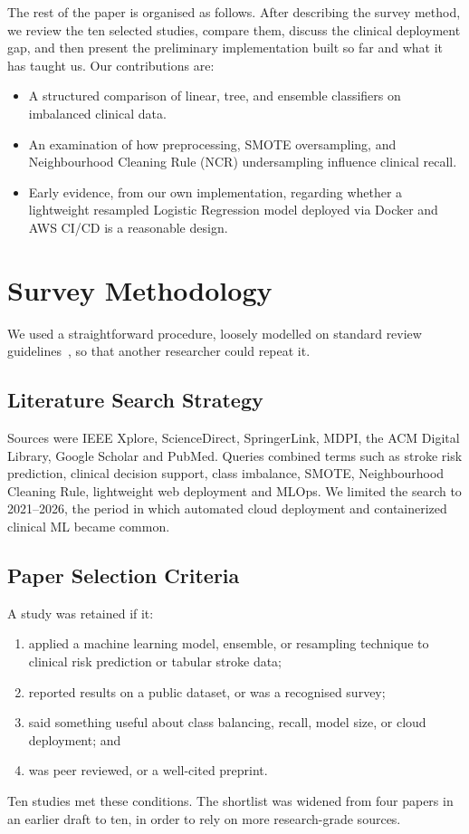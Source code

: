 \documentclass[10pt,twocolumn,a4paper]{article}
\begin{document}
The rest of the paper is organised as follows. After describing the survey method, we review the ten selected studies, compare them, discuss the clinical deployment gap, and then present the preliminary implementation built so far and what it has taught us. Our contributions are:
\begin{itemize}
    \item A structured comparison of linear, tree, and ensemble classifiers on imbalanced clinical data.
    \item An examination of how preprocessing, SMOTE oversampling, and Neighbourhood Cleaning Rule (NCR) undersampling influence clinical recall.
    \item Early evidence, from our own implementation, regarding whether a lightweight resampled Logistic Regression model deployed via Docker and AWS CI/CD is a reasonable design.
\end{itemize}

\section{Survey Methodology}
We used a straightforward procedure, loosely modelled on standard review guidelines~\cite{kitchenham2007, okoli2015}, so that another researcher could repeat it.

\subsection{Literature Search Strategy}
Sources were IEEE Xplore, ScienceDirect, SpringerLink, MDPI, the ACM Digital Library, Google Scholar and PubMed. Queries combined terms such as stroke risk prediction, clinical decision support, class imbalance, SMOTE, Neighbourhood Cleaning Rule, lightweight web deployment and MLOps. We limited the search to 2021--2026, the period in which automated cloud deployment and containerized clinical ML became common.

\subsection{Paper Selection Criteria}
A study was retained if it:
\begin{enumerate}
    \item applied a machine learning model, ensemble, or resampling technique to clinical risk prediction or tabular stroke data;
    \item reported results on a public dataset, or was a recognised survey;
    \item said something useful about class balancing, recall, model size, or cloud deployment; and
    \item was peer reviewed, or a well-cited preprint.
\end{enumerate}
Ten studies met these conditions. The shortlist was widened from four papers in an earlier draft to ten, in order to rely on more research-grade sources.
\end{document}
